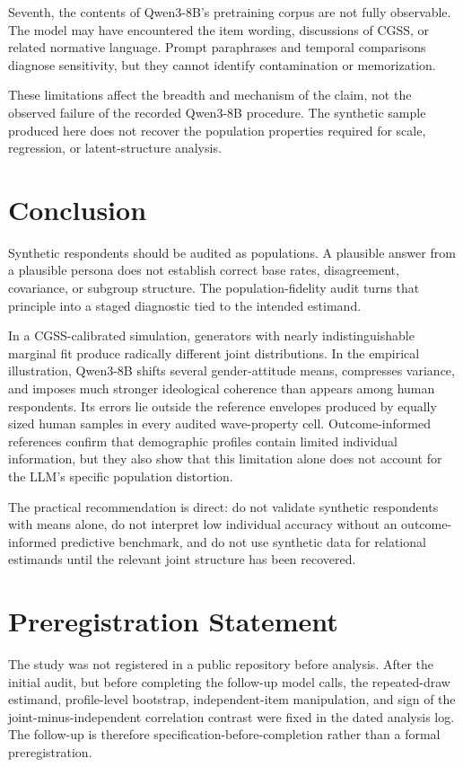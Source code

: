 \documentclass[10pt,twocolumn]{article}
\newcommand{\CGSS}{CGSS\xspace}
\begin{document}
Seventh, the contents of Qwen3-8B's pretraining corpus are not fully observable. The model may have
encountered the item wording, discussions of \CGSS, or related normative language. Prompt
paraphrases and temporal comparisons diagnose sensitivity, but they cannot identify contamination
or memorization.

These limitations affect the breadth and mechanism of the claim, not the observed failure of the
recorded Qwen3-8B procedure. The synthetic sample produced here does not recover the population
properties required for scale, regression, or latent-structure analysis.

\section{Conclusion}

Synthetic respondents should be audited as populations. A plausible answer from a plausible persona
does not establish correct base rates, disagreement, covariance, or subgroup structure. The
population-fidelity audit turns that principle into a staged diagnostic tied to the intended
estimand.

In a CGSS-calibrated simulation, generators with nearly indistinguishable marginal fit produce
radically different joint distributions. In the empirical illustration, Qwen3-8B shifts several
gender-attitude means, compresses variance, and imposes much stronger ideological coherence than
appears among human respondents. Its errors lie outside the reference envelopes produced by
equally sized human samples in every audited wave-property cell. Outcome-informed references
confirm that demographic profiles contain limited individual information, but they also show that
this limitation alone does not account for the LLM's specific population distortion.

The practical recommendation is direct: do not validate synthetic respondents with means alone, do
not interpret low individual accuracy without an outcome-informed predictive benchmark, and do not use
synthetic data for relational estimands until the relevant joint structure has been recovered.

\section*{Preregistration Statement}

The study was not registered in a public repository before analysis. After the initial audit, but
before completing the follow-up model calls, the repeated-draw estimand, profile-level bootstrap,
independent-item manipulation, and sign of the joint-minus-independent correlation contrast were
fixed in the dated analysis log. The follow-up is therefore specification-before-completion rather
than a formal preregistration.
\end{document}
